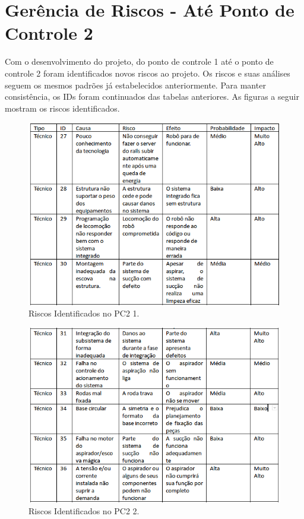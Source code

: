 \section{Gerência de Riscos - Até Ponto de Controle 2}

Com o desenvolvimento do projeto, do ponto de controle 1 até o ponto de controle 2 foram identificados novos riscos ao projeto. Os riscos e suas análises seguem os mesmos padrões já estabelecidos anteriormente. Para manter consistência, os IDs foram continuados das tabelas anteriores. As figuras a seguir mostram os riscos identificados.

\begin{figure}[H]
	\centering
	\includegraphics[scale=0.5]{figuras/riscos_pc2_1.png}
	\caption{Riscos Identificados no PC2 1.}
	\label{img:riscospc21}
\end{figure}

\begin{figure}[H]
	\centering
	\includegraphics[scale=0.5]{figuras/riscos_pc2_2.png}
	\caption{Riscos Identificados no PC2 2.}
	\label{img:riscospc22}
\end{figure}

